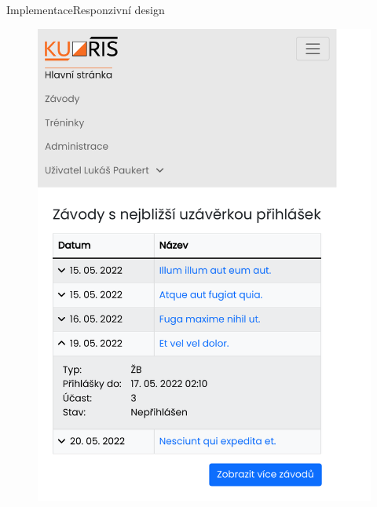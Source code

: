 \documentclass[aspectratio=169]{beamer}
\begin{document}
\begin{frame}{Implementace}{Responzivní design}
    \begin{figure}[h]
        \hfill
        \begin{minipage}[b]{0.3\linewidth}
            \includegraphics[width=0.9\linewidth, cfbox=lightgray 0.5pt 0pt]{images/homepage.pdf}
        \end{minipage}
        \hfill
        \begin{minipage}[b]{0.3\linewidth}

\end{minipage}
\end{figure}
\end{frame}
\end{document}
